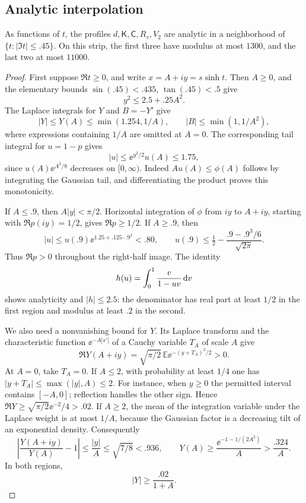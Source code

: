\subsection{Analytic interpolation}

\begin{lemma}\label{lem:scalar-strip}
As functions of $t$, the profiles $d,\mathsf K,\mathsf C,R_v,V_2$ are analytic in a neighborhood of $\{t:|\Im t|\le .45\}$. On this strip, the first three have modulus at most $1300$, and the last two at most $11000$.
\end{lemma}

\begin{proof}
First suppose $\Re t\ge0$, and write $x=A+iy=s\sinh t$. Then $A\ge0$, and the elementary bounds $\sin(.45)<.435$, $\tan(.45)<.5$ give
\[
 y^2\le2.5+.25A^2.
\]
The Laplace integrals for $Y$ and $B=-Y'$ give
\[
 |Y|\le Y(A)\le\min(1.254,1/A),\qquad
 |B|\le\min(1,1/A^2),
\]
where expressions containing $1/A$ are omitted at $A=0$. The corresponding tail integral for $u=1-p$ gives
\[
 |u|\le \ee^{y^2/2}u(A)\le1.75,
\]
since $u(A)\ee^{A^2/8}$ decreases on $[0,\infty)$. Indeed $Au(A)\le\phi(A)$ follows by integrating the Gaussian tail, and differentiating the product proves this monotonicity.

If $A\le.9$, then $A|y|<\pi/2$. Horizontal integration of $\phi$ from $iy$ to $A+iy$, starting with $\Re p(iy)=1/2$, gives $\Re p\ge1/2$. If $A\ge.9$, then
\[
 |u|\le u(.9)\ee^{1.25+.125\cdot.9^2}<.80,
 \qquad
 u(.9)\le\tfrac12-\frac{.9-.9^3/6}{\sqrt{2\pi}}.
\]
Thus $\Re p>0$ throughout the right-half image. The identity
\[
 h(u)=\int_0^1\frac{v}{1-uv}\,\mathrm{d} v
\]
shows analyticity and $|h|\le2.5$: the denominator has real part at least $1/2$ in the first region and modulus at least $.2$ in the second.

We also need a nonvanishing bound for $Y$. Its Laplace transform and the characteristic function $\ee^{-A|s'|}$ of a Cauchy variable $T_A$ of scale $A$ give
\[
 \Re Y(A+iy)=\sqrt{\pi/2}\,
      \mathbb{E} \ee^{-(y+T_A)^2/2}>0.
\]
At $A=0$, take $T_A=0$. If $A\le2$, with probability at least $1/4$ one has $|y+T_A|\le\max(|y|,A)\le2$. For instance, when $y\ge0$ the permitted interval contains $[-A,0]$; reflection handles the other sign. Hence $\Re Y\ge\sqrt{\pi/2}\ee^{-2}/4>.02$. If $A\ge2$, the mean of the integration variable under the Laplace weight is at most $1/A$, because the Gaussian factor is a decreasing tilt of an exponential density. Consequently
\[
 \left|\frac{Y(A+iy)}{Y(A)}-1\right|\le\frac{|y|}{A}
 \le\sqrt{7/8}<.936,
 \qquad
 Y(A)\ge\frac{\ee^{-1-1/(2A^2)}}{A}>\frac{.324}{A}.
\]
In both regions,
\[
 |Y|\ge\frac{.02}{1+A}.
\]


\end{proof}
